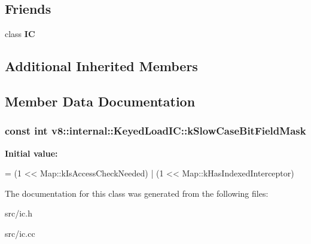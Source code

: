 \subsection*{Friends}
\begin{DoxyCompactItemize}
\item 
\hypertarget{classv8_1_1internal_1_1_keyed_load_i_c_ae59e849648858af1fd22081890d47b78}{}class {\bfseries I\+C}\label{classv8_1_1internal_1_1_keyed_load_i_c_ae59e849648858af1fd22081890d47b78}

\end{DoxyCompactItemize}
\subsection*{Additional Inherited Members}


\subsection{Member Data Documentation}
\hypertarget{classv8_1_1internal_1_1_keyed_load_i_c_a590ff3648a597dedd5d8e81f207e1428}{}
\subsubsection[{k\+Slow\+Case\+Bit\+Field\+Mask}]{\setlength{\rightskip}{0pt plus 5cm}const int v8\+::internal\+::\+Keyed\+Load\+I\+C\+::k\+Slow\+Case\+Bit\+Field\+Mask\hspace{0.3cm}{\ttfamily [static]}}\label{classv8_1_1internal_1_1_keyed_load_i_c_a590ff3648a597dedd5d8e81f207e1428}
{\bfseries Initial value\+:}
\begin{DoxyCode}
=
      (1 << Map::kIsAccessCheckNeeded) | (1 << Map::kHasIndexedInterceptor)
\end{DoxyCode}


The documentation for this class was generated from the following files\+:\begin{DoxyCompactItemize}
\item 
src/ic.\+h\item 
src/ic.\+cc\end{DoxyCompactItemize}
